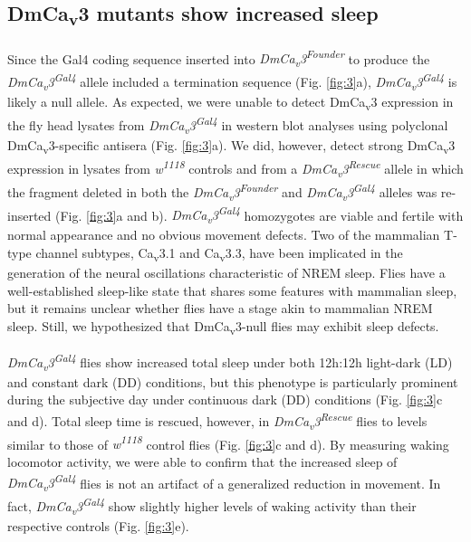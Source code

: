 \subsection*{DmCa\textsubscript{v}3 mutants show increased sleep}

Since the Gal4 coding sequence inserted into \emph{DmCa\textsubscript{v}3\textsuperscript{Founder}} to produce the \emph{DmCa\textsubscript{v}3\textsuperscript{Gal4}} allele included a termination sequence (Fig. \ref{fig:3}a), \emph{DmCa\textsubscript{v}3\textsuperscript{Gal4}} is likely a null allele.
As expected, we were unable to detect DmCa\textsubscript{v}3 expression in the fly head lysates from \emph{DmCa\textsubscript{v}3\textsuperscript{Gal4}} in western blot analyses using polyclonal DmCa\textsubscript{v}3-specific antisera (Fig. \ref{fig:3}a). We did, however, detect strong DmCa\textsubscript{v}3 expression in lysates from \emph{w\textsuperscript{1118}} controls and from a \emph{DmCa\textsubscript{v}3\textsuperscript{Rescue}} allele in which the fragment deleted in both the \emph{DmCa\textsubscript{v}3\textsuperscript{Founder}} and \emph{DmCa\textsubscript{v}3\textsuperscript{Gal4}} alleles was re-inserted (Fig. \ref{fig:3}a and b).
\emph{DmCa\textsubscript{v}3\textsuperscript{Gal4}} homozygotes are viable and fertile with normal appearance and no obvious movement defects.
Two of the mammalian T-type channel subtypes, Ca\textsubscript{v}3.1 and Ca\textsubscript{v}3.3, have been implicated in the generation of the neural oscillations characteristic of NREM sleep.
Flies have a well-established sleep-like state that shares some features with mammalian sleep, but it remains unclear whether flies have a stage akin to mammalian NREM sleep.
Still, we hypothesized that DmCa\textsubscript{v}3-null flies may exhibit sleep defects.

\emph{DmCa\textsubscript{v}3\textsuperscript{Gal4}} flies show increased total sleep under both 12h:12h light-dark (LD) and constant dark (DD) conditions, but this phenotype is particularly prominent during the subjective day under continuous dark (DD) conditions (Fig. \ref{fig:3}c and d).
Total sleep time is rescued, however, in \emph{DmCa\textsubscript{v}3\textsuperscript{Rescue}} flies to levels similar to those of \emph{w\textsuperscript{1118}} control flies (Fig. \ref{fig:3}c and d).
By measuring waking locomotor activity, we were able to confirm that the increased sleep of \emph{DmCa\textsubscript{v}3\textsuperscript{Gal4}} flies is not an artifact of a generalized reduction in movement. In fact, \emph{DmCa\textsubscript{v}3\textsuperscript{Gal4}} show slightly higher levels of waking activity than their respective controls (Fig. \ref{fig:3}e).

